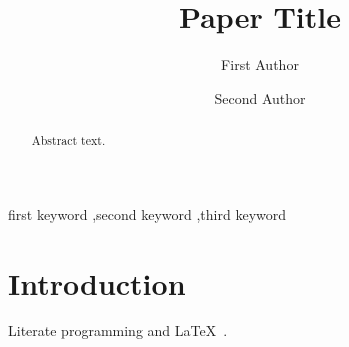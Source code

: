 \documentclass[preprint,12pt]{elsarticle}
\begin{document}
\begin{frontmatter}
\title{Paper Title}
\author[inst1]{First Author}
\author[inst2]{Second Author}
\begin{abstract}
Abstract text.
\end{abstract}
\begin{keyword}
first keyword \sep second keyword \sep third keyword
\end{keyword}
\end{frontmatter}
\section{Introduction}
Literate programming \cite{knuth1984literate} and \LaTeX\ \cite{lamport1994latex}.


\end{document}
